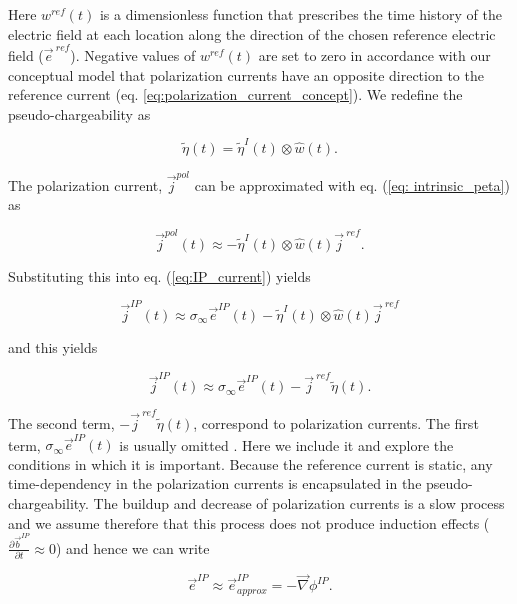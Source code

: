 \documentclass[letterpaper,11pt]{article}
\newcommand{\grad}{\vec \nabla}
\newcommand{\siginf}{\sigma_\infty}
\renewcommand {\j}  { {\vec j} }
\renewcommand {\b}  { {\vec b} }
\newcommand {\e}  { {\vec e} }
\newcommand{\peta}{\tilde{\eta}}
\newcommand{\eref}{\e^{\ ref}}
\newcommand{\jref}{\j^{\ ref}}
\begin{document}
Here $w^{ref}(t)$ is a dimensionless function that prescribes the time history of the electric field at each location along the direction of the chosen reference electric field ($\eref$).  Negative values of  $w^{ref}(t)$ are set to zero in accordance with our conceptual model that polarization currents have an opposite direction to the reference current (eq. \ref{eq:polarization_current_concept}).
We redefine the pseudo-chargeability as
\begin{linenomath*}
\begin{equation}
    \peta(t) = \peta^{I}(t)\otimes \hat{w}(t).
    \label{eq: pseudochargeability}
\end{equation}
\end{linenomath*}
The polarization current, $\j^{pol}$ can be approximated with eq. (\ref{eq: intrinsic_peta}) as
\begin{linenomath*}
\begin{equation}
  \j^{pol}(t) \approx - \peta^{I}(t)\otimes \hat{w}(t)\jref.
\end{equation}
\end{linenomath*}
Substituting this into eq. (\ref{eq:IP_current}) yields
\begin{linenomath*}
\begin{equation}
  \j^{IP}(t) \approx \siginf\e^{IP}(t) - \peta^{I}(t)\otimes \hat{w}(t)\jref
\end{equation}
\end{linenomath*}
and this yields
\begin{linenomath*}
\begin{equation}
  \j^{IP}(t) \approx \siginf\e^{IP}(t) -\jref\peta(t).
  \label{eq: jip_EMIP}
\end{equation}
\end{linenomath*}

The second term, $-\jref\peta(t)$, correspond to polarization currents. The first term, $\siginf \e^{IP}(t)$ is usually omitted \cite[]{Smith1988a}. Here we include it and explore the conditions in which it is important. 
Because the reference current is static, any time-dependency in the polarization currents is encapsulated in the pseudo-chargeability. The buildup and decrease of polarization currents is a slow process and we assume therefore that this process does not produce induction effects ($\frac{\partial \b^{IP}}{\partial t} \approx 0$) and hence we can write 
\begin{linenomath*}
\begin{equation}
  \e^{IP} \approx  \e^{IP}_{approx} = -\grad\phi^{IP}.
  \label{eq: eip_approx}
\end{equation}
\end{linenomath*}
\end{document}
